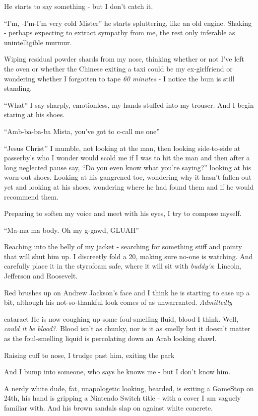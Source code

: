 \documentclass[19pt,openany]{book}
\begin{document}
He starts to say something - but I don't catch it.

``I'm, -I'm-I'm very cold Mister'' he
starts spluttering, like an old engine.
Shaking - perhaps expecting to extract
sympathy from me, the rest only
inferable as unintelligible murmur.

Wiping residual powder shards
from my nose, thinking
whether or not I've left
the oven or whether the Chinese
exiting a taxi could be
my ex-girlfriend or wondering
whether I forgotten
to tape \textit{60 minutes}
- I notice
the bum is still standing.

``What'' I say sharply, emotionless,
my hands
stuffed into my trouser. And I
begin staring
at his shoes.

``Amb-ba-ba-ba Mista, you've got to
c-call me one''

``Jesus Christ'' I mumble,
not looking at the man,
then looking side-to-side
at passerby's who I wonder
would scold me if I was
to hit the man
and then
after a long neglected pause
say, ``Do you even
know what you're
saying?'' looking at his
worn-out shoes. Looking at his
gangrened toe, wondering why
it hasn't fallen out yet and
looking at his shoes, wondering
where he had found them and
if he would recommend them.

Preparing to soften my voice
and meet with his eyes,
I try to compose myself.

``Ma-ma ma body. Oh my g-gawd, GLUAH''

Reaching into the belly of my jacket -
searching for something stiff and pointy
that will shut him up.
I discreetly fold a 20,
making sure no-one is watching.
And carefully place it in the styrofoam
safe, where it will sit with
\textit{buddy's}: Lincoln,
Jefferson and Roosevelt.

Red brushes up on Andrew Jackson's face
and I think he is starting to ease up a bit,
although his not-so-thankful look
comes of as unwarranted. \textit{Admittedly}

cataract He is now coughing up some foul-smelling fluid,
blood I think. Well, \textit{could it be
blood?}. Blood isn't as chunky, nor is
it as smelly but it doesn't matter as
the foul-smelling liquid is percolating
down an Arab looking shawl.

Raising cuff to nose, I trudge past him,
exiting the park

And I bump into someone,
who says he knows me - but I don't know him.

A nerdy white dude,
fat, unapologetic
looking, bearded, is
exiting a GameStop on 24th, his hand is
gripping a Nintendo Switch title - with
a cover I am vaguely familiar with.
And his brown sandals slap on against
white concrete.
\end{document}
